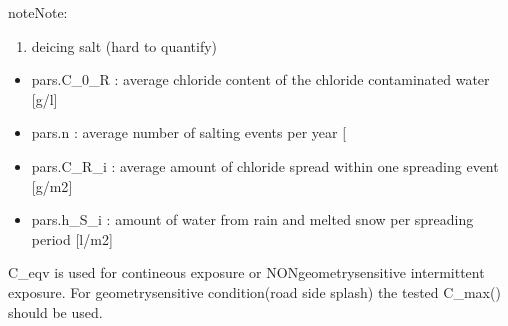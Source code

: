 \documentclass[letterpaper,10pt,english]{sphinxmanual}
\begin{document}
\begin{fulllineitems}
\begin{sphinxadmonition}{note}{Note:}
\begin{itemize}
\end{itemize}
\begin{enumerate}
%
\setcounter{enumi}{1}
\item {} 
\sphinxAtStartPar
de\sphinxhyphen{}icing salt (hard to quantify)

\end{enumerate}
\begin{itemize}
\item {} 
\sphinxAtStartPar
pars.C\_0\_R : average chloride content of the chloride contaminated water {[}g/l{]}

\item {} 
\sphinxAtStartPar
pars.n     : average number of salting events per year {[}\sphinxhyphen{}{]}

\item {} 
\sphinxAtStartPar
pars.C\_R\_i : average amount of chloride spread within one spreading event {[}g/m2{]}

\item {} 
\sphinxAtStartPar
pars.h\_S\_i : amount of water from rain and melted snow per spreading period {[}l/m2{]}

\end{itemize}

\sphinxAtStartPar
C\_eqv is used for contineous exposure or NON\sphinxhyphen{}geometry\sphinxhyphen{}sensitive intermittent exposure.
For geometry\sphinxhyphen{}sensitive condition(road side splash) the tested C\_max() should be used.
\end{sphinxadmonition}

\end{fulllineitems}

\end{document}
